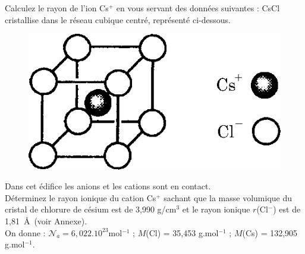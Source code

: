 Calculez le rayon de l'ion Cs$^+$ en vous servant des donn\'ees suivantes : 
CsCl cristallise dans le r\'eseau cubique centr\'e, repr\'esent\'e ci-dessous.

\begin{figure}[!h]
\begin{center}
\includegraphics[scale=0.8]{figure/cristalloCsCl.eps}
\end{center}
\end{figure}

Dans cet \'edifice les anions et les cations sont en contact.\\
D\'eterminez le rayon ionique du cation Cs$^+$ sachant que la masse volumique du cristal de chlorure de c\'esium est de 3,990 g/cm$^3$ et le rayon ionique $r$(Cl$^-$) est de 1,81~\AA\ (voir Annexe).\\
On donne : $\mathcal{N}_a=6,022.10^{23}$mol$^{-1}$ ; $M$(Cl) = 35,453 g.mol$^{-1}$ ; $M$(Cs) = 132,905 g.mol$^{-1}$.
